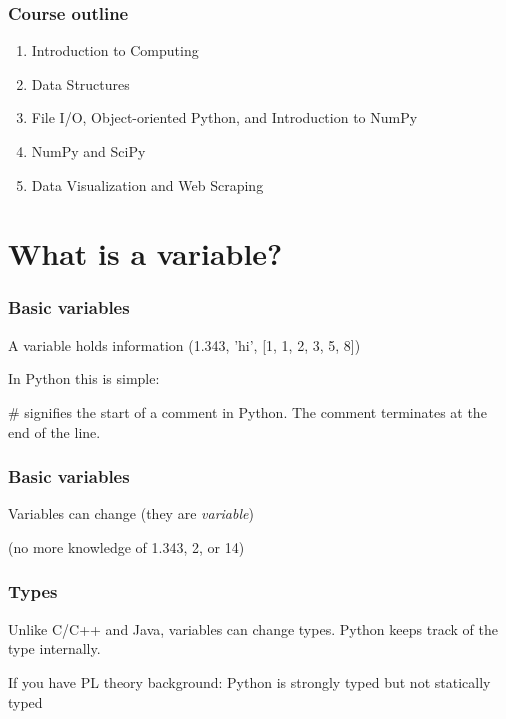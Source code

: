 \documentclass{beamer}
\begin{document}
\begin{frame}
\frametitle{Course outline}

\begin{enumerate}
\setlength{\itemsep}{0.2in}

\item{Introduction to Computing}
\item{Data Structures}
\item{File I/O, Object-oriented Python, and Introduction to NumPy}
\item{NumPy and SciPy}
\item{Data Visualization and Web Scraping}

\end{enumerate}

\end{frame}



\section{What is a variable?}
\begin{frame}
\frametitle{Basic variables}

A variable holds information (1.343, 'hi', [1, 1, 2, 3, 5, 8])

\vspace{0.2in}

In Python this is simple:


\textcolor{comment-color}{\#} signifies the start of a comment in Python.  The comment terminates at the end of the line.

\end{frame}


\begin{frame}
\frametitle{Basic variables}

Variables can change (they are \emph{variable})



(no more knowledge of 1.343, 2, or 14)

\end{frame}

\begin{frame}
\frametitle{Types}
Unlike C/C++ and Java, variables can change types. Python keeps track of the type internally.


If you have PL theory background: Python is strongly typed but not statically typed

\end{frame}
\end{document}
